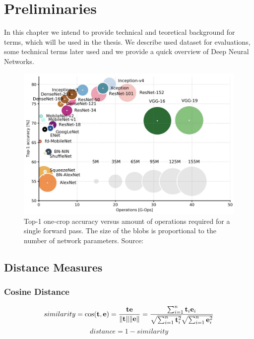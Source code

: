 

\chapter{Preliminaries}

In this chapter we intend to provide technical and teoretical background for terms, which will be used in the thesis. We describe used dataset for evaluations, some technical terms later used and we provide a quick overview of Deep Neural Networks.

\begin{figure}
	\includegraphics[width=0.8\linewidth]{img/network-comparison.jpeg}
	\caption{Top-1 one-crop accuracy versus amount of operations required for a single forward pass. The size of the blobs is proportional to the number of network parameters. Source: \cite{canziani2016analysis}}
	\label{fig:camera-setup}
\end{figure}


\section{Distance Measures}

\subsection{Cosine Distance}
\begin{equation}
similarity = \cos ({\bf t},{\bf e})= {{\bf t} {\bf e} \over \|{\bf t}\| \|{\bf e}\|} = \frac{ \sum_{i=1}^{n}{{\bf t}_i{\bf e}_i} }{ \sqrt{\sum_{i=1}^{n}{{\bf t}_i^2}} \sqrt{\sum_{i=1}^{n}{{\bf e}_i^2}} }
\end{equation}
\begin{equation}
    distance = 1 - similarity
\end{equation}

